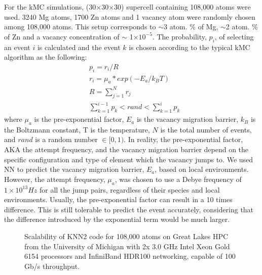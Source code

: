 For the \ac{kMC} simulations, (30$\times$30$\times$30) supercell containing 108,000 atoms were used. 3240 Mg atoms, 1700 Zn atoms and 1 vacancy atom were randomly chosen among 108,000 atoms. This setup corresponds to $\sim$3 atom. \% of Mg, $\sim$2 atom. \% of Zn and a vacancy concentration of $\sim$ 1$\times10^{-5}$. The probability, $p_i$, of selecting an event $i$ is calculated and the event $k$ is chosen according to the typical \ac{kMC} algorithm as the following:
\begin{subequations}
\begin{align}
& p_i = r_i / R    \label{Chap:Al/Vac:eq:prob} \\
& r_i = \mu_a * exp(- E_a / k_B T)  \label{Chap:Al/Vac:eq:rate} \\
& R = \sum_{j=1}^N r_j \label{Chap:Al/Vac:eq:R} \\
& \sum_{k=1}^{i-1} p_k < rand < \sum_{k=1}^{i} p_k \label{Chap:Al/Vac:eq:choice}
\end{align}
\end{subequations}
where $\mu_a$ is the pre-exponential factor, $E_a$ is the vacancy migration barrier, $k_B$ is the Boltzmann constant, T is the temperature, $N$ is the total number of events, and $rand$ is a random number $\in [0, 1)$. In reality, the pre-exponential factor, AKA the attempt frequency, and the vacancy migration barrier depend on the specific configuration \cite{osti_323431,van2001first,le2002kinetic} and type of element which the vacancy jumps to\cite{clouet2004nucleation}. We used \ac{NN} to predict the vacancy migration barrier, $E_a$, based on local environments. However, the attempt frequency, $\mu_a$, was chosen to use a Debye frequency of $1\times10^{13} Hz$ for all the jump pairs, regardless of their species and local environments. Usually, the pre-exponential factor can result in a 10 times difference\cite{sha2005kinetic}. This is still tolerable to predict the event accurately, considering that the difference introduced by the exponential term would be much larger.


\begingroup
\begin{figure}[!ht]
  \centering
\caption[Scalability of KNN2 code on Great Lakes HPC.]{Scalability of KNN2 code for 108,000 atoms on Great Lakes HPC from the University of Michigan with 2x 3.0 GHz Intel Xeon Gold 6154 processors and InfiniBand HDR100 networking, capable of 100 Gb/s throughput.}
\label{Chap:Al/Vac:fig:scale}
\end{figure}
\endgroup


